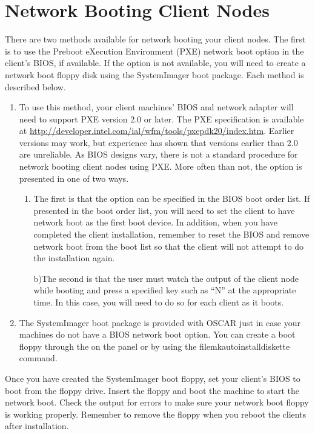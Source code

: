%
%
%

\section{Network Booting Client Nodes}
\label{app:net-boot-client-nodes}

There are two methods available for network booting your client nodes.
The first is to use the Preboot eXecution Environment (PXE) network
boot option in the client's BIOS, if available. If the option is not
available, you will need to create a network boot floppy disk using
the SystemImager boot package. Each method is described below.

\begin{enumerate}
\item {} To use this method, your client
  machines' BIOS and network adapter will need to support PXE version
  2.0 or later. The PXE specification is available at
  \url{http://developer.intel.com/ial/wfm/tools/pxepdk20/index.htm}.
  Earlier versions may work, but experience has shown that versions
  earlier than 2.0 are unreliable. As BIOS designs vary, there is not
  a standard procedure for network booting client nodes using PXE.
  More often than not, the option is presented in one of two ways.

  \begin{enumerate}
  \item The first is that the option can be specified in the BIOS boot
    order list. If presented in the boot order list, you will need to
    set the client to have network boot as the first boot device. In
    addition, when you have completed the client installation,
    remember to reset the BIOS and remove network boot from the boot
    list so that the client will not attempt to do the installation
    again.
    
    b)The second is that the user must watch the output of the client
    node while booting and press a specified key such as ``N'' at the
    appropriate time. In this case, you will need to do so for each
    client as it boots.
  \end{enumerate}
  
\item {} The SystemImager
  boot package is provided with OSCAR just in case your machines do not
  have a BIOS network boot option.
  You can create a boot floppy through the  on the 
   panel or by using the file{mkautoinstalldiskette}
  command.
\end{enumerate}

Once you have created the SystemImager boot floppy,
set your client's BIOS to boot from the floppy
drive. Insert the floppy and boot the machine to start the network
boot. Check the output for errors to make sure your network boot
floppy is working properly. Remember to remove the floppy when you
reboot the clients after installation.
